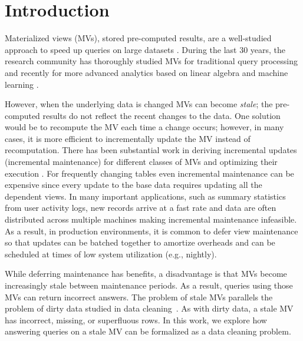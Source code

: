 \vspace{-0.5em}
\section{Introduction}
Materialized views (MVs), stored pre-computed results, are a well-studied approach to speed up queries on large datasets \cite{LarsonY85, gupta1995maintenance, chirkova2011materialized}.
During the last 30 years, the research community has thoroughly studied MVs for traditional query processing and recently for more advanced analytics based on linear algebra and machine learning \cite{nikolic2014linview, zhang2014mat}.

However, when the underlying data is changed MVs can become \emph{stale}; the pre-computed results do not reflect the recent changes to the data. 
One solution would be to recompute the MV each time a change occurs; however, in many cases, it is more efficient to incrementally update the MV instead of recomputation.
There has been substantial work in deriving incremental updates (incremental maintenance) for different classes of MVs and optimizing their execution \cite{chirkova2011materialized, DBLP:journals/vldb/KochAKNNLS14}.
For frequently changing tables even incremental maintenance can be expensive since every update to the base data requires updating all the dependent views.  
In many important applications, such as summary statistics from user activity logs, new records arrive at a fast rate and data are often distributed across multiple machines making incremental maintenance infeasible. 
As a result, in production environments, it is common to defer view maintenance \cite{chirkova2011materialized, zhou2007lazy, DBLP:conf/sigmod/ColbyGLMT96} so that updates can be batched together to amortize overheads and can be scheduled at times of low system utilization (e.g., nightly).  

While deferring maintenance  has benefits, a disadvantage is that MVs become increasingly stale between maintenance periods.
As a result, queries using those MVs can return incorrect answers.
The problem of stale MVs parallels the problem of dirty data studied in data cleaning~\cite{rahm2000data}.
As with dirty data, a stale MV has incorrect, missing, or superfluous rows.
In this work, we explore how answering queries on a stale MV can be formalized as a data cleaning problem. 

